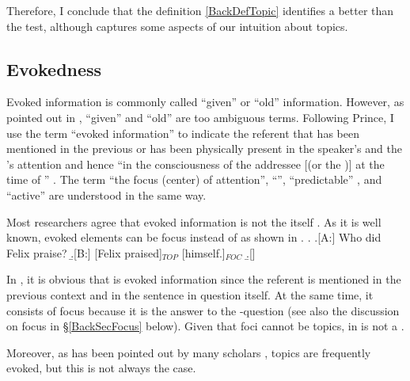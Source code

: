 Therefore, I conclude that
the definition \ref{BackDefTopic} identifies a 
better than the  test,
although  captures some aspects of our intuition about topics.


\subsection{Evokedness}\label{BackEvoked}

Evoked information is commonly called ``given'' or ``old'' information.
However, as pointed out in ,
``given'' and ``old'' are too ambiguous terms.
Following Prince,
I use the term ``evoked information'' to indicate the referent that has been mentioned in the previous  or has been physically present in the speaker's and the 's attention
and hence ``in the consciousness of the addressee [(or the )] at the time of '' \cite[30]{chafe76}.
The term ``the focus (center) of attention'', ``'', ``predictable'' \cite{kuno72}, and ``active'' \cite{portner07} are understood in the same way.

Most researchers agree that evoked information is not the  itself \cite[]{reinhart81,gundel88,lambrecht94}.
As it is well known, evoked elements can be focus instead of  as shown in \Next[B].
%
\ex.\label{BackExHimself} \a.[A:] Who did Felix praise?
     \b.[B:] [Felix praised]$_{TOP}$ [himself.]$_{FOC}$
     \b.[] \hfill{\cite[72, style modified by NN]{reinhart81}}

In \Last[B], it is obvious that  is evoked information
since the referent is mentioned in the previous context and in the sentence in question itself.
At the same time, it consists of focus because
it is the answer to the -question (see also the discussion on focus in \S \ref{BackSecFocus} below).
Given that foci cannot be topics,
 in \Last[B] is not a .

Moreover, as has been pointed out by many scholars \cite[see][]{li76,givon83,halliday04},
topics are frequently evoked, but this is not always the case.


